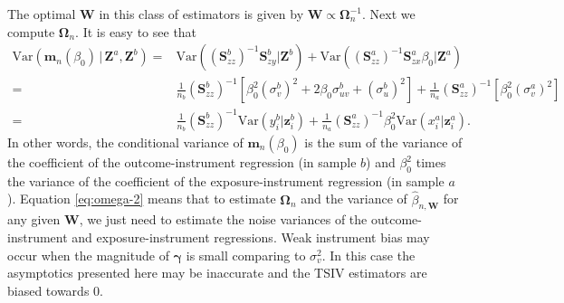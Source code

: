 \documentclass[preprint]{imsart}
\begin{document}
The optimal $\mathbf{W}$ in this class of estimators is given by $\mathbf{W} \propto
\bm{\Omega}_n^{-1}$. Next we compute $\bm{\Omega}_n$. It is easy to
see that
\begin{align}
  \mathrm{Var}(\mathbf{m}_n(\beta_0)\,|\,\mathbf{Z}^a,\mathbf{Z}^b)
  =& \mathrm{Var}((\mathbf{S}^b_{zz})^{-1} \mathbf{S}^b_{zy}|\mathbf{Z}^b) +
  \mathrm{Var}((\mathbf{S}^a_{zz})^{-1}
  \mathbf{S}^a_{zx}\beta_0|\mathbf{Z}^a) \nonumber \\
  =&\frac{1}{n_b} (\mathbf{S}_{zz}^b)^{-1} [\beta_0^2 (\sigma_v^b)^2 + 2 \beta_0
  \sigma_{uv}^b + (\sigma_u^b)^2] + \frac{1}{n_a}
  (\mathbf{S}_{zz}^a)^{-1} [\beta_0^2 (\sigma_v^a)^2] \nonumber \\
  =& \frac{1}{n_b} (\mathbf{S}_{zz}^b)^{-1} \mathrm{Var}(y_i^b|\mathbf{z}_i^b) +
  \frac{1}{n_a}(\mathbf{S}_{zz}^a)^{-1} \beta_0^2
  \mathrm{Var}(x_i^a|\mathbf{z}_i^a). \label{eq:omega-2}
\end{align}
In other words, the conditional variance of $\mathbf{m}_n(\beta_0)$ is
the sum of the variance of the coefficient of the outcome-instrument
regression (in sample $b$) and $\beta_0^2$ times the variance of the
coefficient of the exposure-instrument regression (in sample
$a$). %
Equation \eqref{eq:omega-2} means that to estimate $\mathbf{\Omega}_n$ and the variance of
$\hat{\beta}_{n,\mathbf{W}}$ for any given $\mathbf{W}$, we just need
to estimate the noise variances of the outcome-instrument and
exposure-instrument regressions. Weak instrument bias may occur when
the magnitude of $\bm \gamma$ is small comparing to $\sigma_v^2$. In
this case the asymptotics presented here may be inaccurate and the
TSIV estimators are biased towards 0.
\end{document}
